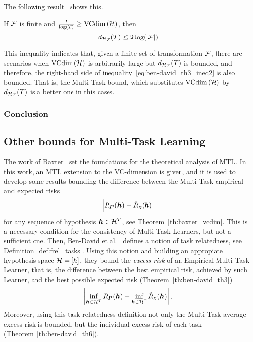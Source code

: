The following result~\cite[Theorem~6]{Ben-DavidB08} shows this.
\begin{theorem}\label{th:ben-david_th6}
    If $\mathcal{F}$ is finite and $\frac{T}{\log (T)} \geq \text{VCdim}\left(\mathcal{H}\right)$, then
    \begin{equation}
        \nonumber
        d_{\mathcal{H}_{\mathcal{F}}}(T) \leq 2 \log(\left|\mathcal{F}\right|)
    \end{equation}
\end{theorem}
This inequality indicates that, given a finite set of transformation $\mathcal{F}$, there are scenarios when $\text{VCdim}\left(\mathcal{H}\right)$ is arbitrarily large but $d_{\mathcal{H}_{\mathcal{F}}}(T)$ is bounded, and therefore, the right-hand side of inequality~\eqref{eq:ben-david_th3_ineq2} is also bounded. That is, the Multi-Task bound, which substitutes $\text{VCdim}\left(\mathcal{H}\right)$ by $d_{\mathcal{H}_{\mathcal{F}}}(T)$ is a better one in this cases. 

\subsubsection*{Conclusion}


\subsection{Other bounds for Multi-Task Learning}

The work of Baxter~\cite{baxter2000model} set the foundations for the theoretical analysis of MTL. 
In this work, an MTL extension to the VC-dimension is given, and it is used to develop some results bounding the difference between the Multi-Task empirical and expected risks 
\begin{equation}
    \nonumber
    \left|R_{\bm{P}}(\bm{h}) - \hat{R}_{\bm{z}}(\bm{h})\right|
\end{equation}
for any sequence of hypothesis $\bm{h} \in \mathcal{H}^T$, see Theorem~\ref{th:baxter_vcdim}. This is a necessary condition for the consistency of Multi-Task Learners, but not a sufficient one.
Then, Ben-David et al.~\cite{Ben-DavidS03,Ben-DavidB08} defines a notion of task relatedness, see Definition~\ref{def:frel_tasks}. Using this notion and building an appropiate hypothesis space $\mathcal{H} = \lbrack h\rbrack$, they bound the \emph{excess risk} of an Empirical Multi-Task Learner, that is, the difference between the best empirical risk, achieved by such Learner, and the best possible expected risk (Theorem~\ref{th:ben-david_th3})
\begin{equation}
    \nonumber
    \left|\inf_{\bm{h} \in \mathcal{H}^T} R_{\bm{P}}(\bm{h}) - \inf_{\bm{h} \in \mathcal{H}^T} \hat{R}_{\bm{z}}(\bm{h})\right| .
\end{equation}
Moreover, using this task relatedness definition not only the Multi-Task average excess risk is bounded, but the individual excess risk of each task (Theorem~\ref{th:ben-david_th6}).


